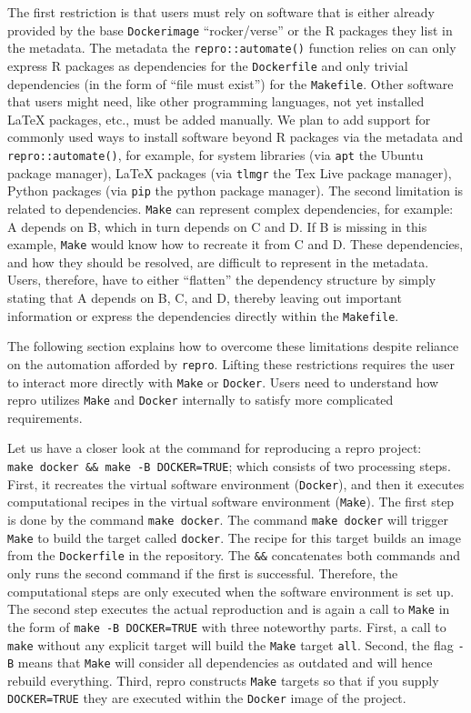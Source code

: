 \documentclass[psych,tutorial,submit,moreauthors,pdftex]{mdpi}
\begin{document}
The first restriction is that users must rely on software that is either
already provided by the base \texttt{Dockerimage} ``rocker/verse'' or
the R packages they list in the metadata. The metadata the
\texttt{repro::automate()} function relies on can only express R
packages as dependencies for the \texttt{Dockerfile} and only trivial
dependencies (in the form of ``file must exist'') for the
\texttt{Makefile}. Other software that users might need, like other
programming languages, not yet installed LaTeX packages, etc., must be
added manually. We plan to add support for commonly used ways to install
software beyond R packages via the metadata and
\texttt{repro::automate()}, for example, for system libraries (via
\texttt{apt} the Ubuntu package manager), LaTeX packages (via
\texttt{tlmgr} the Tex Live package manager), Python packages (via
\texttt{pip} the python package manager). The second limitation is
related to dependencies. \texttt{Make} can represent complex
dependencies, for example: A depends on B, which in turn depends on C
and D. If B is missing in this example, \texttt{Make} would know how to
recreate it from C and D. These dependencies, and how they should be
resolved, are difficult to represent in the metadata. Users, therefore,
have to either ``flatten'' the dependency structure by simply stating
that A depends on B, C, and D, thereby leaving out important information
or express the dependencies directly within the \texttt{Makefile}.

The following section explains how to overcome these limitations despite
reliance on the automation afforded by \texttt{repro}. Lifting these
restrictions requires the user to interact more directly with
\texttt{Make} or \texttt{Docker}. Users need to understand how repro
utilizes \texttt{Make} and \texttt{Docker} internally to satisfy more
complicated requirements.

Let us have a closer look at the command for reproducing a repro
project: \texttt{make\ docker\ \&\&\ make\ -B\ DOCKER=TRUE}; which
consists of two processing steps. First, it recreates the virtual
software environment (\texttt{Docker}), and then it executes
computational recipes in the virtual software environment
(\texttt{Make}). The first step is done by the command
\texttt{make\ docker}. The command \texttt{make\ docker} will trigger
\texttt{Make} to build the target called \texttt{docker}. The recipe for
this target builds an image from the \texttt{Dockerfile} in the
repository. The \texttt{\&\&} concatenates both commands and only runs
the second command if the first is successful. Therefore, the
computational steps are only executed when the software environment is
set up. The second step executes the actual reproduction and is again a
call to \texttt{Make} in the form of \texttt{make\ -B\ DOCKER=TRUE} with
three noteworthy parts. First, a call to \texttt{make} without any
explicit target will build the \texttt{Make} target \texttt{all}.
Second, the flag \texttt{-B} means that \texttt{Make} will consider all
dependencies as outdated and will hence rebuild everything. Third, repro
constructs \texttt{Make} targets so that if you supply
\texttt{DOCKER=TRUE} they are executed within the \texttt{Docker} image
of the project.
\end{document}
